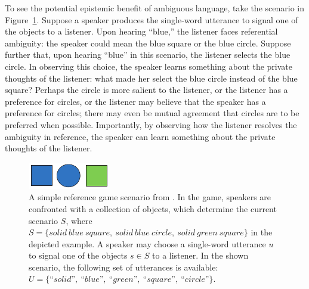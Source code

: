 \documentclass[11pt,a4paper]{article}
\begin{document}


To see the potential epistemic benefit of ambiguous language, take the scenario in Figure~\ref{FG-ref-game}.
Suppose a speaker produces the single-word utterance to signal one of the objects to a listener. Upon hearing ``blue,'' the listener faces referential ambiguity: the speaker could mean the blue square or the blue circle. 
Suppose further that, upon hearing ``blue'' in this scenario, the listener selects the blue circle.
In observing this choice, the speaker learns something about the private thoughts of the listener: what made her select the blue circle instead of the blue square? Perhaps the circle is more salient to the listener, or the listener has a preference for circles, or the listener may believe that the speaker has a preference for circles; there may even be mutual agreement that circles are to be preferred when possible. Importantly, by observing how the listener resolves the ambiguity in reference, the speaker can learn something about the private thoughts of the listener.


\begin{figure}
	\centering
	\includegraphics[width=.5\linewidth]{images/rsascene-eps-converted-to.pdf}
	\caption{A simple reference game scenario from \protect{}.
		In the game, speakers are confronted with a collection of objects, which determine the current scenario $S$, where $S=\{solid\ blue\ square,\ solid\ blue\ circle,\ solid\ green\ square\}$ in the depicted example. 
		A speaker may choose a single-word utterance $u$ to signal one of the objects $s\in S$ to a listener.
		In the shown scenario, the following set of utterances is available: $U =\{\textit{``solid''},\ \textit{``blue''},\ \textit{``green''},\ \textit{``square''},\ \textit{``circle''}\}$.
		}
	\label{FG-ref-game}
\end{figure}
\end{document}
